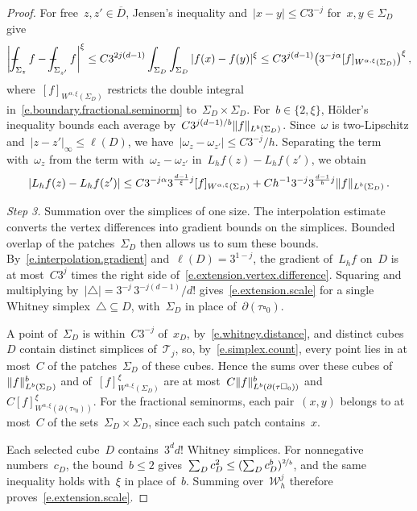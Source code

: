 \documentclass[11pt,letterpaper]{article}
\numberwithin{equation}{section}
\theoremstyle{definition}
\newcommand{\nf}{\nicefrac}
\newcommand{\cu}{\square}
\DeclarePairedDelimiter{\norm}{\lVert}{\rVert}
\renewcommand{\subset}{\subseteq}
\def\Xint#1{\mathchoice
	{\XXint\displaystyle\textstyle{#1}}%
	{\XXint\textstyle\scriptstyle{#1}}%
	{\XXint\scriptstyle\scriptscriptstyle{#1}}%
	{\XXint\scriptscriptstyle\scriptscriptstyle{#1}}%
	\!\int}
\def\XXint#1#2#3{{\setbox0=\hbox{$#1{#2#3}{\int}$}
		\vcenter{\hbox{$#2#3$}}\kern-.5\wd0}}
\def\fint{\Xint-}
\begin{document}
\begin{proof}
For free~$z,z'\in\overline D$, Jensen's inequality and~$|x-y|\leq C3^{-j}$ for~$x,y\in\Sigma_D$ give
\begin{equation*}
	\biggl|\fint_{\Sigma_z}f-\fint_{\Sigma_{z'}}f\biggr|^\xi\leq C3^{2j(d-1)}\int_{\Sigma_D}\int_{\Sigma_D}|f(x)-f(y)|^\xi\leq C3^{j(d-1)}\bigl(3^{-j\alpha}[f]_{W^{\alpha,\xi}(\Sigma_D)}\bigr)^\xi\,,
\end{equation*}
where~$[f]_{W^{\alpha,\xi}(\Sigma_D)}$ restricts the double integral in~\eqref{e.boundary.fractional.seminorm} to~$\Sigma_D\times\Sigma_D$. For~$b\in\{2,\xi\}$, H\"older's inequality bounds each average by~$C3^{j(d-1)/b}\norm{f}_{L^b(\Sigma_D)}$. Since~$\omega$ is two-Lipschitz and~$|z-z'|_\infty\leq\ell(D)$, we have~$|\omega_z-\omega_{z'}|\leq C3^{-j}/h$. Separating the term with~$\omega_z$ from the term with~$\omega_z-\omega_{z'}$ in~$L_hf(z)-L_hf(z')$, we obtain
\begin{equation}
	|L_hf(z)-L_hf(z')|\leq C3^{-j\alpha}3^{\frac{d-1}\xi j}[f]_{W^{\alpha,\xi}(\Sigma_D)}+Ch^{-1}3^{-j}3^{\frac{d-1}bj}\norm{f}_{L^b(\Sigma_D)}\,.
	\label{e.extension.vertex.difference}
\end{equation}

\smallskip

\emph{Step 3.} Summation over the simplices of one size. The interpolation estimate converts the vertex differences into gradient bounds on the simplices. Bounded overlap of the patches~$\Sigma_D$ then allows us to sum these bounds. By~\eqref{e.interpolation.gradient} and~$\ell(D)=3^{1-j}$, the gradient of~$L_hf$ on~$D$ is at most~$C3^j$ times the right side of~\eqref{e.extension.vertex.difference}. Squaring and multiplying by~$|\triangle|=3^{-j}\,3^{-j(d-1)}/d!$ gives~\eqref{e.extension.scale} for a single Whitney simplex~$\triangle\subset D$, with~$\Sigma_D$ in place of~$\partial(\tau\cu_0)$.

A point of~$\Sigma_D$ is within~$C3^{-j}$ of~$x_D$, by~\eqref{e.whitney.distance}, and distinct cubes~$D$ contain distinct simplices of~$\mathscr T_j$, so, by~\eqref{e.simplex.count}, every point lies in at most~$C$ of the patches~$\Sigma_D$ of these cubes. Hence the sums over these cubes of~$\norm{f}^b_{L^b(\Sigma_D)}$ and of~$[f]^\xi_{W^{\alpha,\xi}(\Sigma_D)}$ are at most~$C\norm{f}^b_{L^b(\partial(\tau\cu_0))}$ and~$C[f]^\xi_{W^{\alpha,\xi}(\partial(\tau\cu_0))}$. For the fractional seminorms, each pair~$(x,y)$ belongs to at most~$C$ of the sets~$\Sigma_D\times\Sigma_D$, since each such patch contains~$x$.

Each selected cube~$D$ contains~$3^dd!$ Whitney simplices. For nonnegative numbers~$c_D$, the bound~$b\leq2$ gives~$\sum_Dc_D^2\leq(\sum_Dc_D^b)^{\nf2b}$, and the same inequality holds with~$\xi$ in place of~$b$. Summing over~$\mathscr W_h^j$ therefore proves~\eqref{e.extension.scale}.


\end{proof}
\end{document}
